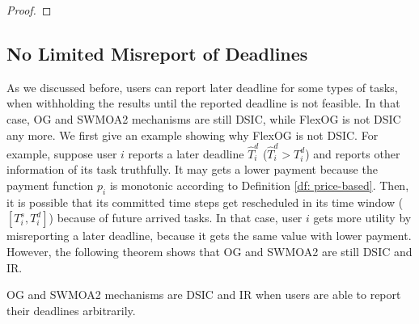 \documentclass[11pt]{phdthesis}
\begin{document}
\begin{proof}
\end{proof}
\subsection{No Limited Misreport of Deadlines} \label{late deadline}
As we discussed before, users can report later deadline for some types of tasks, when withholding the results until the reported deadline is not feasible. In that case, OG and SWMOA2 mechanisms are still DSIC, while FlexOG is not DSIC any more. We first give an example showing why FlexOG is not DSIC. For example, suppose user $ i $ reports a later deadline $ \hat{T}_i^d $ ($ \hat{T}_i^d > T_i^d $) and reports other information of its task truthfully. It may gets a lower payment because the payment function $ p_i $ is monotonic according to Definition \ref{df: price-based}. Then, it is possible that its committed time steps get rescheduled in its time window ($ [T_i^s, T_i^d] $) because of future arrived tasks. In that case, user $ i $ gets more utility by misreporting a later deadline, because it gets the same value with lower payment. However, the following theorem shows that OG and SWMOA2 are still DSIC and IR. 
\begin{theorem} \label{th: arbitary misreport of deadlines}
    OG and SWMOA2 mechanisms are DSIC and IR when users are able to report their deadlines arbitrarily. 
\end{theorem}
\end{document}
